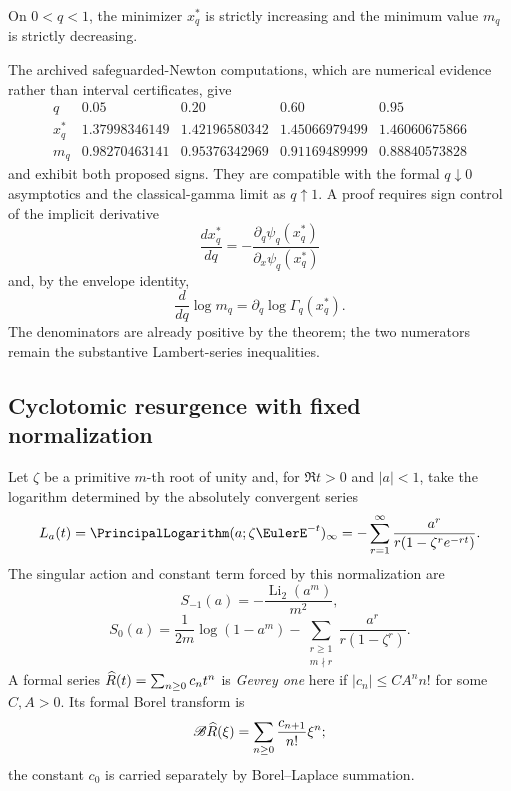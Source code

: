 \begin{conjecture}
\label{conj:qgamma-monotone-minimizer}
On \(0<q<1\), the minimizer \(x_q^\ast\) is strictly increasing and the
minimum value \(m_q\) is strictly decreasing.
\end{conjecture}

The archived safeguarded-Newton computations, which are numerical evidence
rather than interval certificates, give
\[
\begin{array}{c|cccc}
q&0.05&0.20&0.60&0.95\\ \hline
x_q^\ast&1.37998346149&1.42196580342&1.45066979499&1.46060675866\\
m_q&0.98270463141&0.95376342969&0.91169489999&0.88840573828
\end{array}
\]
and exhibit both proposed signs.  They are compatible with the formal
\(q\downarrow0\) asymptotics and the classical-gamma limit as
\(q\uparrow1\).  A proof requires sign control of the implicit derivative
\[
 \frac{d x_q^\ast}{dq}
   =-\frac{\partial_q\psi_q(x_q^\ast)}
           {\partial_x\psi_q(x_q^\ast)}
\]
and, by the envelope identity,
\[
 \frac{d}{dq}\log m_q
   =\partial_q\log\Gamma_q(x_q^\ast).
\]
The denominators are already positive by the theorem; the two numerators
remain the substantive Lambert-series inequalities.

\subsection{Cyclotomic resurgence with fixed normalization}

Let \(\zeta\) be a primitive \(m\)-th root of unity and, for
\(\Re t>0\) and \(\lvert a\rvert<1\), take the logarithm determined by the
absolutely convergent series
\[
 L_a(t)
  =\PrincipalLogarithm(a;\zeta \EulerE^{-t})_\infty
  =-\sum_{r=1}^{\infty}
     \frac{a^r}{r(1-\zeta^re^{-rt})}.
\]
The singular action and constant term forced by this normalization are
\[
 S_{-1}(a)=-\frac{\operatorname{Li}_2(a^m)}{m^2},
\]
\[
 S_0(a)
  =\frac{1}{2m}\log(1-a^m)
   -\sum_{\substack{r\ge1\\m\nmid r}}
      \frac{a^r}{r(1-\zeta^r)}.
\]
A formal series \(\widehat{R}(t)=\sum_{n\ge0}c_nt^n\) is
\emph{Gevrey one} here if
\(\lvert c_n\rvert\le CA^n n!\) for some \(C,A>0\).  Its formal Borel
transform is
\[
\mathscr B\widehat{R}(\xi)
  =\sum_{n\ge0}\frac{c_{n+1}}{n!}\xi^n;
\]
the constant \(c_0\) is carried separately by Borel--Laplace summation.

